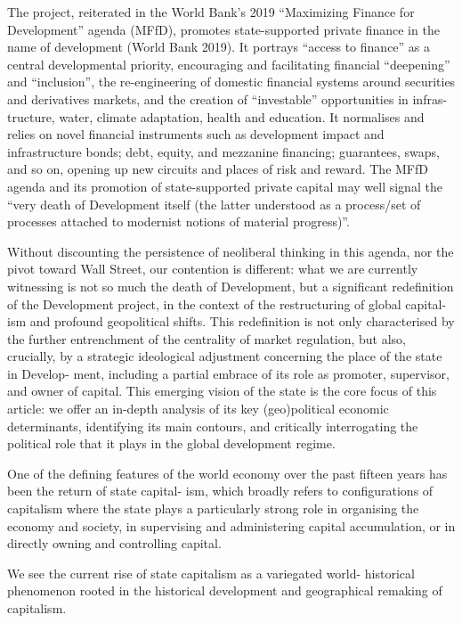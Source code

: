 \documentclass[
]{book}
\begin{document}
The project, reiterated in the World Bank's 2019 ``Maximizing Finance for
Development'' agenda (MFfD), promotes state-supported private finance in the
name of development (World Bank 2019). It portrays ``access to finance'' as a
central developmental priority, encouraging and facilitating financial ``deepening''
and ``inclusion'', the re-engineering of domestic financial systems around securities
and derivatives markets, and the creation of ``investable'' opportunities in infras-
tructure, water, climate adaptation, health and education. It normalises and relies
on novel financial instruments such as development impact and infrastructure
bonds; debt, equity, and mezzanine financing; guarantees, swaps, and so on,
opening up new circuits and places of risk and reward.
The MFfD agenda and its
promotion of state-supported private capital may well signal the ``very death of
Development itself (the latter understood as a process/set of processes attached
to modernist notions of material progress)''.

Without discounting the persistence of neoliberal thinking in this agenda, nor
the pivot toward Wall Street, our contention is different: what we are currently
witnessing is not so much the death of Development, but a significant redefinition
of the Development project, in the context of the restructuring of global capital-
ism and profound geopolitical shifts. This redefinition is not only characterised by
the further entrenchment of the centrality of market regulation, but also, crucially,
by a strategic ideological adjustment concerning the place of the state in Develop-
ment, including a partial embrace of its role as promoter, supervisor, and owner of
capital. This emerging vision of the state is the core focus of this article: we offer
an in-depth analysis of its key (geo)political economic determinants, identifying its
main contours, and critically interrogating the political role that it plays in the
global development regime.

One of the defining features of
the world economy over the past fifteen years has been the return of state capital-
ism, which broadly refers to configurations of capitalism where the state plays a
particularly strong role in organising the economy and society, in supervising and
administering capital accumulation, or in directly owning and controlling capital.

We see the current rise of state capitalism as a variegated world-
historical phenomenon rooted in the historical development and geographical
remaking of capitalism.
\end{document}
